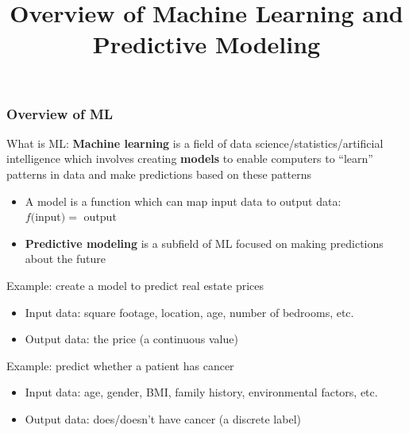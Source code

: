 \documentclass{beamer}
\title{Overview of Machine Learning and Predictive Modeling}
\date{}
\begin{document}
\frame{\titlepage}


\begin{frame}
	\frametitle{Overview of ML}
	
	\begin{alertblock}{What is ML:}
		\footnotesize
		\textbf{Machine learning} is a field of data science/statistics/artificial intelligence which involves creating \textbf{models} to enable computers to ``learn'' patterns in data and make predictions based on these patterns
		\begin{itemize}
			\item A model is a function which can map input data to output data: \\
			$f($input$) = $ output
			\item \textbf{Predictive modeling} is a subfield of ML focused on making predictions about the future
		\end{itemize}
		
		\vspace{10pt}
		Example: create a model to predict real estate prices
		\begin{itemize}
			\item Input data: square footage, location, age, number of bedrooms, etc.
			\item Output data: the price (a continuous value)
		\end{itemize}
		
		\vspace{10pt}
		Example: predict whether a patient has cancer
		\begin{itemize}
			\item Input data: age, gender, BMI, family history, environmental factors, etc.
			\item Output data: does/doesn't have cancer (a discrete label)
		\end{itemize}
	\end{alertblock}
\end{frame}
\end{document}
